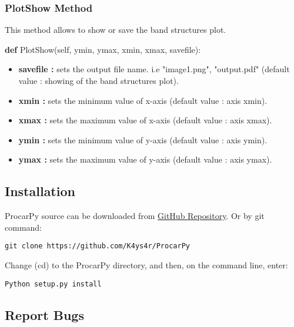 \documentclass[11pt]{article}
\providecommand{\tightlist}{%
      \setlength{\itemsep}{0pt}\setlength{\parskip}{0pt}}
\newenvironment{Shaded}{}{}
\newcommand{\KeywordTok}[1]{\textcolor[rgb]{0.00,0.44,0.13}{\textbf{{#1}}}}
\newcommand{\NormalTok}[1]{{#1}}
\newcommand{\VariableTok}[1]{\textcolor[rgb]{0.10,0.09,0.49}{{#1}}}
\begin{document}
\subsubsection{PlotShow Method}\label{plotshow-method}

This method allows to show or save the band structures plot.

\begin{Shaded}
\begin{Highlighting}[]
\KeywordTok{def} \NormalTok{PlotShow(}\VariableTok{self}\NormalTok{, ymin, ymax, xmin, xmax, savefile):}
\end{Highlighting}
\end{Shaded}

\begin{itemize}
\tightlist
\item
  \textbf{savefile :} sets the output file name. i.e "image1.png",
  "output.pdf" (default value : showing of the band structures plot).
\item
  \textbf{xmin :} sets the minimum value of x-axis (default value : axis
  xmin).
\item
  \textbf{xmax :} sets the maximum value of x-axis (default value : axis
  xmax).
\item
  \textbf{ymin :} sets the minimum value of y-axis (default value : axis
  ymin).
\item
  \textbf{ymax :} sets the maximum value of y-axis (default value : axis
  ymax).
\end{itemize}

\subsection{Installation}\label{installation}

ProcarPy source can be downloaded from
\href{https://github.com/K4ys4r/ProcarPy}{GitHub Repository}. Or by git
command:

\begin{verbatim}
git clone https://github.com/K4ys4r/ProcarPy
\end{verbatim}

Change (cd) to the ProcarPy directory, and then, on the command line,
enter:

\begin{verbatim}
Python setup.py install
\end{verbatim}

\subsection{Report Bugs}\label{report-bugs}
\end{document}
